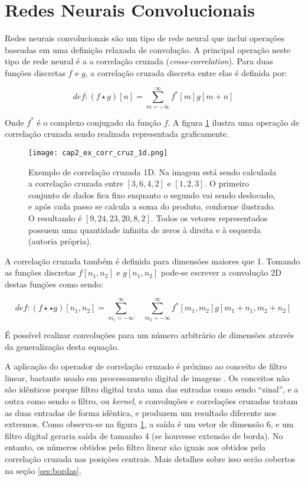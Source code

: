 \section{Redes Neurais Convolucionais} \label{sec:rnc}
Redes neurais convolucionais são um tipo de rede neural que inclui operações
baseadas em uma definição relaxada de convolução. A principal operação
neste tipo de rede neural é a a correlação cruzada (\emph{cross-correlation}).
Para duas funções discretas $f$ e $g$, a correlação cruzada discreta entre
elas é definida por:

\begin{equation}
	def: (f \star g)[n] = \sum_{m=-\infty}^{\infty} f^*[m]g[m+n]
\end{equation}

Onde $f^*$ é o complexo conjugado da função $f$. A figura
\ref{fig:cap2_ex_corr_cruz_1d} ilustra uma operação de correlação cruzada sendo
realizada representada graficamente.

\begin{figure}[!htb]
	\centering
	\texttt{[image: cap2\_ex\_corr\_cruz\_1d.png]}
	\caption[Exemplo de correlação cruzada 1D]{
		Exemplo de correlação cruzada 1D.
		Na imagem está sendo calculada a correlação cruzada entre $[3,6,4,2]$ e
		$[1,2,3]$. O primeiro conjunto de dados fica fixo enquanto o segundo vai
		sendo deslocado, e após cada passo se calcula a soma do produto, conforme
		ilustrado. O resultando é $[9,24,23,20,8,2]$. Todos os vetores
		representados possuem uma quantidade infinita de zeros à direita e à
		esquerda (autoria própria).}
	\label{fig:cap2_ex_corr_cruz_1d}
\end{figure}

A correlação cruzada também é definida para dimensões maiores que 1.
Tomando as funções discretas $f[n_1,n_2]$ e $g[n_1,n_2]$ pode-se 
escrever a convolução 2D destas funções como sendo:

\begin{equation}
	def: (f \star\star g)[n_1,n_2] =
		\sum_{m_1=-\infty}^{\infty} \quad
		\sum_{m_2=-\infty}^{\infty}
		f^*[m_1,m_2]g[m_1+n_1,m_2+n_2]
\end{equation}

É possível realizar convoluções para um número arbitrário de dimensões através
da generalização desta equação.

A aplicação do operador de correlação cruzado é próximo ao conceito de filtro
linear, bastante usado em processamento digital de imagens
\cite{gonzalezwoods200708}. Os conceitos não
são idênticos porque filtro digital trata uma das entradas como sendo
``sinal'',
e a outra como sendo o filtro, ou \emph{kernel}, e convoluções e correlações
cruzadas tratam as duas entradas de forma idêntica, e produzem um resultado
diferente nos extremos. Como observa-se na figura
\ref{fig:cap2_ex_corr_cruz_1d}, a saída é um vetor de dimensão 6, e um filtro
digital geraria saída de tamanho 4 (se houvesse extensão de borda).
No entanto, os números obtidos pelo filtro linear são iguais aos obtidos pela
correlação cruzada nas posições centrais. Mais detalhes sobre isso
serão cobertos na seção \ref{ses:bordas}.

